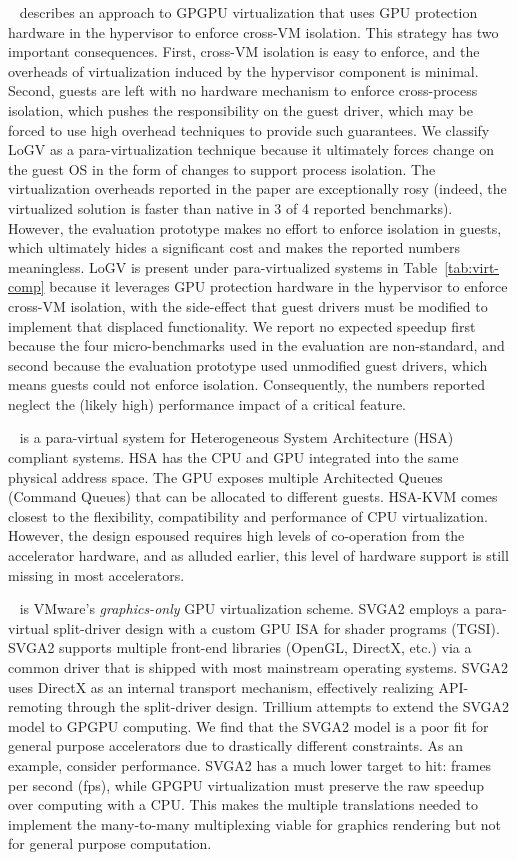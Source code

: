 ~\cite{logv} describes an approach to GPGPU virtualization
that uses GPU protection hardware in the hypervisor to enforce cross-VM
isolation. This strategy has two important consequences. First, cross-VM
isolation is easy to enforce, and the overheads of virtualization induced by
the hypervisor component is minimal. Second, guests are left with no hardware
mechanism to enforce cross-process isolation, which pushes the responsibility
on the guest driver, which may be forced to use high overhead techniques to
provide such guarantees. We classify LoGV as a para-virtualization technique
because it ultimately forces change on the guest OS in the form of changes to
support process isolation. The virtualization overheads reported in the paper
are exceptionally rosy (indeed, the virtualized solution is faster than native
in 3 of 4 reported benchmarks). However, the evaluation prototype makes no
effort to enforce isolation in guests, which ultimately hides a significant
cost and makes the reported numbers meaningless.
LoGV is present under para-virtualized systems in Table~\ref{tab:virt-comp}
because it leverages GPU  protection hardware in the hypervisor to enforce
cross-VM isolation, with the side-effect that guest drivers must be modified
to implement that displaced functionality. We report no expected speedup first
because the four micro-benchmarks used in the evaluation are non-standard, and
second because the evaluation prototype used unmodified guest drivers, which
means guests could not enforce isolation. Consequently, the numbers reported
neglect the (likely high) performance impact of a critical feature.

~\cite{kaveri16vee} is a para-virtual system for
Heterogeneous System Architecture (HSA) compliant systems. HSA has the CPU and
GPU integrated into the same physical address space. The GPU exposes multiple
Architected Queues (Command Queues) that can be allocated to different guests.
HSA-KVM comes closest to the flexibility, compatibility and performance of CPU
virtualization. However, the design espoused requires high levels of
co-operation from the accelerator hardware, and as alluded earlier, this level
of hardware support is still missing in most accelerators.

~\cite{dowty2009gpu} is VMware's \emph{graphics-only} GPU
virtualization scheme. SVGA2 employs a para-virtual split-driver design with a
custom GPU ISA for shader programs (TGSI). SVGA2 supports multiple front-end
libraries (OpenGL, DirectX, etc.) via a common driver that is shipped with
most mainstream operating systems. SVGA2 uses DirectX as an internal transport
mechanism, effectively realizing API-remoting through the split-driver design.
Trillium attempts to extend the SVGA2 model to GPGPU computing. We find that
the SVGA2 model is a poor fit for general purpose accelerators due to
drastically different constraints. As an example, consider performance. SVGA2
has a much lower target to hit: frames per second (fps), while GPGPU
virtualization must preserve the raw speedup over computing with a CPU.
This makes the multiple translations needed to implement the many-to-many
multiplexing viable for graphics rendering but not for general purpose
computation.

